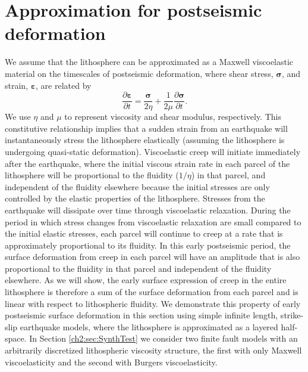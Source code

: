 \section{Approximation for postseismic deformation} 
We assume that the lithosphere can be approximated as a Maxwell
viscoelastic material on the timescales of postseismic deformation,
where shear stress, $\mathbf{\sigma}$, and strain,
$\mathbf{\varepsilon}$, are related by
\begin{equation}
\frac{\partial\mathbf{\varepsilon}}{\partial t} =
\frac{\mathbf{\sigma}}{2\eta} + 
\frac{1}{2\mu}\frac{\partial\mathbf{\sigma}}{\partial t}.
\end{equation}
We use $\eta$ and $\mu$ to represent viscosity and shear modulus,
respectively.  This constitutive relationship implies that a sudden
strain from an earthquake will instantaneously stress the lithosphere
elastically (assuming the lithosphere is undergoing quasi-static
deformation).  Viscoelastic creep will initiate immediately after the
earthquake, where the initial viscous strain rate in each parcel of
the lithosphere will be proportional to the fluidity ($1/\eta$) in
that parcel, and independent of the fluidity elsewhere because the
initial stresses are only controlled by the elastic properties of the
lithosphere.  Stresses from the earthquake will dissipate over time
through viscoelastic relaxation.  During the period in which stress
changes from viscoelastic relaxation are small compared to the initial
elastic stresses, each parcel will continue to creep at a rate that is
approximately proportional to its fluidity.  In this early postseismic
period, the surface deformation from creep in each parcel will have an
amplitude that is also proportional to the fluidity in that parcel and
independent of the fluidity elsewhere.  As we will show, the early
surface expression of creep in the entire lithosphere is therefore a
sum of the surface deformation from each parcel and is linear with
respect to lithospheric fluidity.  We demonstrate this property of
early postseismic surface deformation in this section using simple
infinite length, strike-slip earthquake models, where the lithosphere
is approximated as a layered half-space. In Section \ref{ch2:sec:SynthTest} we
consider two finite fault models with an arbitrarily discretized
lithospheric viscosity structure, the first with only Maxwell
viscoelasticity and the second with Burgers viscoelasticity.

